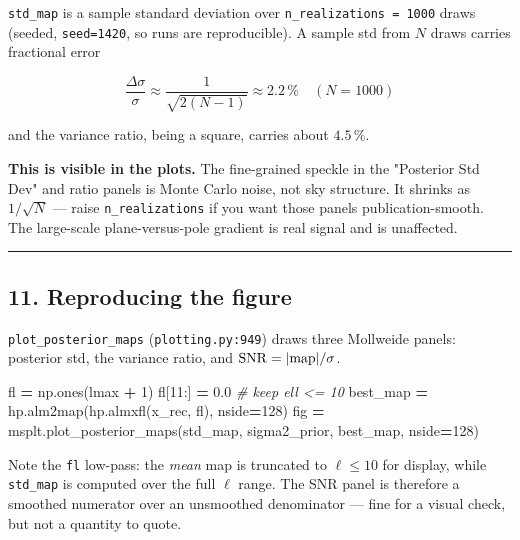 \documentclass[
  11pt,
]{article}
\newenvironment{Shaded}{\begin{snugshade}}{\end{snugshade}}
\newcommand{\CommentTok}[1]{\textcolor[rgb]{0.56,0.35,0.01}{\textit{#1}}}
\newcommand{\DecValTok}[1]{\textcolor[rgb]{0.00,0.00,0.81}{#1}}
\newcommand{\FloatTok}[1]{\textcolor[rgb]{0.00,0.00,0.81}{#1}}
\newcommand{\NormalTok}[1]{#1}
\newcommand{\OperatorTok}[1]{\textcolor[rgb]{0.81,0.36,0.00}{\textbf{#1}}}
\begin{document}
\texttt{std\_map} is a sample standard deviation over
\texttt{n\_realizations\ =\ 1000} draws (seeded, \texttt{seed=1420}, so
runs are reproducible). A sample std from \(N\) draws carries fractional
error

\[ \frac{\Delta\sigma}{\sigma} \approx \frac{1}{\sqrt{2(N-1)}} \approx 2.2\,\% \quad (N = 1000) \]

and the variance ratio, being a square, carries about \(4.5\,\%\).

\textbf{This is visible in the plots.} The fine-grained speckle in the
"Posterior Std Dev" and ratio panels is Monte Carlo noise, not sky
structure. It shrinks as \(1/\sqrt{N}\) --- raise
\texttt{n\_realizations} if you want those panels publication-smooth.
The large-scale plane-versus-pole gradient is real signal and is
unaffected.

\begin{center}\rule{0.5\linewidth}{0.5pt}\end{center}

\hypertarget{11-reproducing-the-figure}{%
\subsection{11. Reproducing the
figure}\label{11-reproducing-the-figure}}

\texttt{plot\_posterior\_maps} (\texttt{plotting.py:949}) draws three
Mollweide panels: posterior std, the variance ratio, and
\(\mathrm{SNR} = |{\rm map}|/\sigma\).

\begin{Shaded}
\begin{Highlighting}[]
\NormalTok{fl }\OperatorTok{=}\NormalTok{ np.ones(lmax }\OperatorTok{+} \DecValTok{1}\NormalTok{)}
\NormalTok{fl[}\DecValTok{11}\NormalTok{:] }\OperatorTok{=} \FloatTok{0.0}                                  \CommentTok{\# keep ell \textless{}= 10}
\NormalTok{best\_map }\OperatorTok{=}\NormalTok{ hp.alm2map(hp.almxfl(x\_rec, fl), nside}\OperatorTok{=}\DecValTok{128}\NormalTok{)}
\NormalTok{fig }\OperatorTok{=}\NormalTok{ msplt.plot\_posterior\_maps(std\_map, sigma2\_prior, best\_map, nside}\OperatorTok{=}\DecValTok{128}\NormalTok{)}
\end{Highlighting}
\end{Shaded}

Note the \texttt{fl} low-pass: the \emph{mean} map is truncated to
\(\ell \le 10\) for display, while \texttt{std\_map} is computed over
the full \(\ell\) range. The SNR panel is therefore a smoothed numerator
over an unsmoothed denominator --- fine for a visual check, but not a
quantity to quote.
\end{document}
